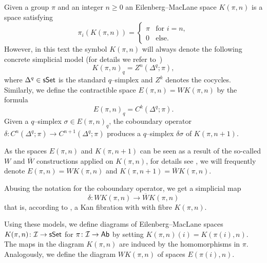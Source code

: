 \documentclass[12pt,a4wide]{article}
\theoremstyle{plain}
\theoremstyle{definition}
\newcommand{\Engen}{WK(\pi,\then)}
\newcommand{\Kngen}{\overline WK(\pi,\then)}
\newcommand{\Kpin}{K(\pi,\then)}
\newcommand{\then}{n}
\newcommand{\thedim}{{n}}
\newcommand{\thedimm}{{k}}
\newcommand{\stdsimp}[1]{\Delta^{#1}}
\renewcommand\:{\colon}
\def\s{\sigma}
\newcommand{\dpi}{\pi}
\newcommand{\dK}{K}
\newcommand{\icat}{\mathcal I}
\begin{document}
Given a group $\pi$ and an integer $\thedim \geq 0$ an Eilenberg--MacLane space $\Kpin$ is a space satisfying
\[
\pi_i (\Kpin) = 
\left\{
	\begin{array}{ll}
		\pi & \mbox{for } i = \thedim,\\
		0 & \mbox{else}.
	\end{array}
\right.
\]
However, in this text the symbol $\Kpin$ will always denote the following concrete simplicial model (for details we refer to~\cite[page 101]{may})
\[
\Kpin_q = Z^\thedim (\stdsimp{q}; \pi),
\] 
where $\stdsimp{q} \in \sSet$ is the standard $q$--simplex and $Z^\thedimm$ denotes the cocycles. Similarly, we define the contractible space $E(\pi, \thedim) = \Engen$ by the formula
\[
E(\pi, \thedim)_q = C^\thedimm (\stdsimp{q}; \pi) .
\]
Given a $q$--simplex $\s \in E(\pi, \thedim)_q$, the coboundary operator $\delta\: C^\thedim (\stdsimp{q}; \pi) \to C^{\thedim+1} (\stdsimp{q}; \pi)$ produces a $q$--simplex $\delta \s$ of $K(\pi, \thedim+1)$. 

As the spaces $ E(\pi, \thedim)$ and $K(\pi, \thedim+1)$ can be seen as a result of the so-called $W$ and $\overline W$ constructions applied on $\Kpin$, for details see \cite{may}, we will frequently denote $E(\pi, \thedim) = \Engen$ and $K(\pi, \thedim+1) = \Kngen$.

Abusing the notation for the coboundary operator, we get a simplicial map 
\[ \delta \colon  \Engen \to \Kngen\] 
that is, according to \cite[Theorem 23.10]{may}, a Kan fibration with with fibre $\Kpin$.

Using these models, we define diagrams of Eilenberg--MacLane spaces $\Kpin\:\icat \to \sSet$ for $\dpi\: \icat \to \Ab$ by setting $\Kpin(i) = K(\dpi(i), \thedim)$. The maps in the diagram $\dK(\dpi, \thedim)$ are induced by the homomorphisms in $\dpi$.
Analogously, we define the diagram $\Engen$ of spaces $E(\dpi(i), \thedim)$.


\end{document}
